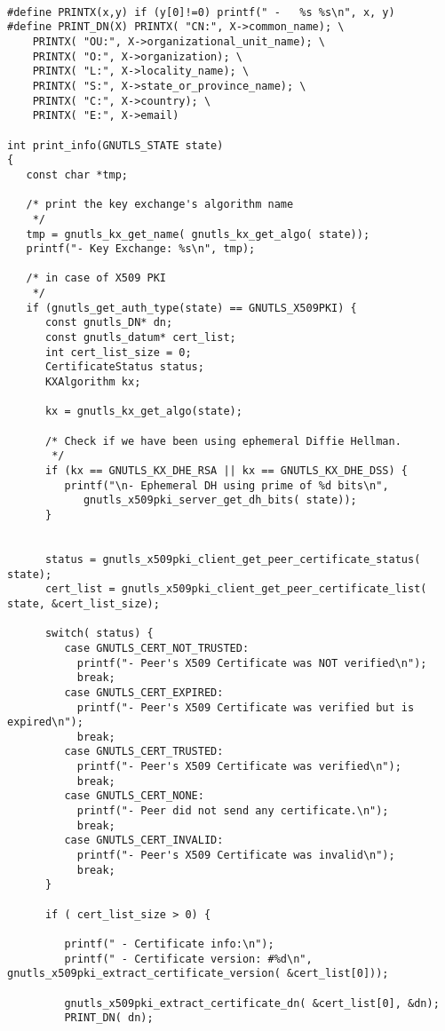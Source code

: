 \begin{verbatim}

#define PRINTX(x,y) if (y[0]!=0) printf(" -   %s %s\n", x, y)
#define PRINT_DN(X) PRINTX( "CN:", X->common_name); \
	PRINTX( "OU:", X->organizational_unit_name); \
	PRINTX( "O:", X->organization); \
	PRINTX( "L:", X->locality_name); \
	PRINTX( "S:", X->state_or_province_name); \
	PRINTX( "C:", X->country); \
	PRINTX( "E:", X->email)

int print_info(GNUTLS_STATE state)
{
   const char *tmp;

   /* print the key exchange's algorithm name
    */
   tmp = gnutls_kx_get_name( gnutls_kx_get_algo( state));
   printf("- Key Exchange: %s\n", tmp);

   /* in case of X509 PKI
    */
   if (gnutls_get_auth_type(state) == GNUTLS_X509PKI) {
      const gnutls_DN* dn;
      const gnutls_datum* cert_list;
      int cert_list_size = 0;
      CertificateStatus status;
      KXAlgorithm kx;

      kx = gnutls_kx_get_algo(state);

      /* Check if we have been using ephemeral Diffie Hellman.
       */
      if (kx == GNUTLS_KX_DHE_RSA || kx == GNUTLS_KX_DHE_DSS) {
         printf("\n- Ephemeral DH using prime of %d bits\n",
            gnutls_x509pki_server_get_dh_bits( state));
      }


      status = gnutls_x509pki_client_get_peer_certificate_status( state);
      cert_list = gnutls_x509pki_client_get_peer_certificate_list( state, &cert_list_size);

      switch( status) {
         case GNUTLS_CERT_NOT_TRUSTED:
           printf("- Peer's X509 Certificate was NOT verified\n");
           break;
         case GNUTLS_CERT_EXPIRED:
           printf("- Peer's X509 Certificate was verified but is expired\n");
           break;
         case GNUTLS_CERT_TRUSTED:
           printf("- Peer's X509 Certificate was verified\n");
           break;
         case GNUTLS_CERT_NONE:
           printf("- Peer did not send any certificate.\n");
           break;
         case GNUTLS_CERT_INVALID:
           printf("- Peer's X509 Certificate was invalid\n");
           break;
      }
		
      if ( cert_list_size > 0) {

         printf(" - Certificate info:\n");
         printf(" - Certificate version: #%d\n", gnutls_x509pki_extract_certificate_version( &cert_list[0]));

         gnutls_x509pki_extract_certificate_dn( &cert_list[0], &dn);
         PRINT_DN( dn);


\end{verbatim}

